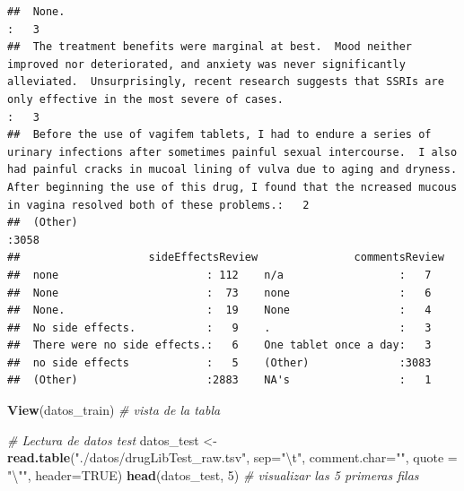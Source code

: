 \documentclass[spanish,]{article}
\newenvironment{Shaded}{\begin{snugshade}}{\end{snugshade}}
\newcommand{\KeywordTok}[1]{\textcolor[rgb]{0.13,0.29,0.53}{\textbf{#1}}}
\newcommand{\DataTypeTok}[1]{\textcolor[rgb]{0.13,0.29,0.53}{#1}}
\newcommand{\DecValTok}[1]{\textcolor[rgb]{0.00,0.00,0.81}{#1}}
\newcommand{\CharTok}[1]{\textcolor[rgb]{0.31,0.60,0.02}{#1}}
\newcommand{\StringTok}[1]{\textcolor[rgb]{0.31,0.60,0.02}{#1}}
\newcommand{\CommentTok}[1]{\textcolor[rgb]{0.56,0.35,0.01}{\textit{#1}}}
\newcommand{\OtherTok}[1]{\textcolor[rgb]{0.56,0.35,0.01}{#1}}
\newcommand{\NormalTok}[1]{#1}
\begin{document}
\begin{verbatim}
##  None.                                                                                                                                                                                                                                                                                                                          :   3  
##  The treatment benefits were marginal at best.  Mood neither improved nor deteriorated, and anxiety was never significantly alleviated.  Unsurprisingly, recent research suggests that SSRIs are only effective in the most severe of cases.                                                                                    :   3  
##  Before the use of vagifem tablets, I had to endure a series of urinary infections after sometimes painful sexual intercourse.  I also had painful cracks in mucoal lining of vulva due to aging and dryness.  After beginning the use of this drug, I found that the ncreased mucous in vagina resolved both of these problems.:   2  
##  (Other)                                                                                                                                                                                                                                                                                                                        :3058  
##                    sideEffectsReview               commentsReview
##  none                       : 112    n/a                  :   7  
##  None                       :  73    none                 :   6  
##  None.                      :  19    None                 :   4  
##  No side effects.           :   9    .                    :   3  
##  There were no side effects.:   6    One tablet once a day:   3  
##  no side effects            :   5    (Other)              :3083  
##  (Other)                    :2883    NA's                 :   1
\end{verbatim}

\begin{Shaded}
\begin{Highlighting}[]
\KeywordTok{View}\NormalTok{(datos_train)    }\CommentTok{# vista de la tabla}

\CommentTok{# Lectura de datos test}
\NormalTok{datos_test <-}\StringTok{ }\KeywordTok{read.table}\NormalTok{(}\StringTok{"./datos/drugLibTest_raw.tsv"}\NormalTok{, }\DataTypeTok{sep=}\StringTok{"}\CharTok{\textbackslash{}t}\StringTok{"}\NormalTok{, }\DataTypeTok{comment.char=}\StringTok{""}\NormalTok{,}
                         \DataTypeTok{quote =} \StringTok{"}\CharTok{\textbackslash{}"}\StringTok{"}\NormalTok{, }\DataTypeTok{header=}\OtherTok{TRUE}\NormalTok{)}
\KeywordTok{head}\NormalTok{(datos_test, }\DecValTok{5}\NormalTok{) }\CommentTok{# visualizar las 5 primeras filas}
\end{Highlighting}
\end{Shaded}
\end{document}
